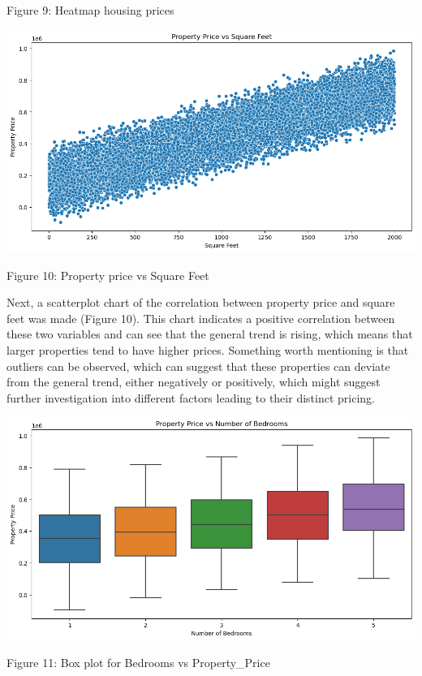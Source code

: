 \documentclass{article}
\begin{document}
\begin{multicols}{2}
{\small
  Figure 9: Heatmap housing prices
  \par
  \vspace{6pt}
}

\includegraphics[scale=.25]{img/dl1.png}

{\small
  Figure 10: Property price vs Square Feet
  \par
  \vspace{6pt}
}



Next, a scatterplot chart of the correlation between property price and square feet was made (Figure 10). This chart indicates a positive correlation between these two variables and can see that the general trend is rising, which means that larger properties tend to have higher prices. Something worth mentioning is that outliers can be observed, which can suggest that these properties can deviate from the general trend, either negatively or positively, which might suggest further investigation into different factors leading to their distinct pricing.

\includegraphics[scale=.25]{img/dl2.png}

{\small
  Figure 11: Box plot for Bedrooms vs Property\_Price
  \par
  \vspace{6pt}
}



\end{multicols}
\end{document}
